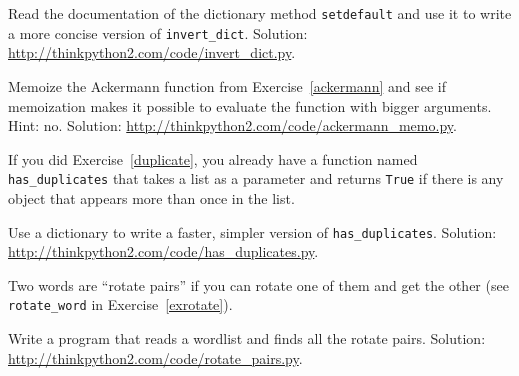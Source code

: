 \documentclass[10pt]{book}
\begin{document}
\begin{exercise}
\label{setdefault}

Read the documentation of the dictionary method {\tt setdefault}
and use it to write a more concise version of \verb"invert_dict".
Solution: \url{http://thinkpython2.com/code/invert_dict.py}.

\end{exercise}


\begin{exercise}
Memoize the Ackermann function from Exercise~\ref{ackermann} and see if
memoization makes it possible to evaluate the function with bigger
arguments.  Hint: no.
Solution: \url{http://thinkpython2.com/code/ackermann_memo.py}.

\end{exercise}



\begin{exercise}

If you did Exercise~\ref{duplicate}, you already have
a function named \verb"has_duplicates" that takes a list
as a parameter and returns {\tt True} if there is any object
that appears more than once in the list.

Use a dictionary to write a faster, simpler version of
\verb"has_duplicates". 
Solution: \url{http://thinkpython2.com/code/has_duplicates.py}.

\end{exercise}


\begin{exercise}
\label{exrotatepairs}

Two words are ``rotate pairs'' if you can rotate one of them
and get the other (see \verb"rotate_word" in Exercise~\ref{exrotate}).

Write a program that reads a wordlist and finds all the rotate
pairs.  Solution: \url{http://thinkpython2.com/code/rotate_pairs.py}.

\end{exercise}
\end{document}
